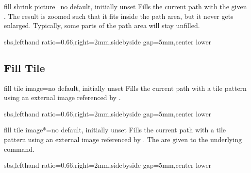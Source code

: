 \documentclass[a4paper,11pt]{article}
\begin{document}
\begin{myvoid}
\begin{docTikzKey}{fill shrink picture}{=}{no default, initially unset}
  Fills the current path with the given .
  The result is zoomed such that it fits inside the path area, but it never
  gets enlarged.
  Typically, some parts of the path area will stay unfilled.
\begin{dispExample*}{sbs,lefthand ratio=0.66,right=2mm,sidebyside gap=5mm,center lower}
\end{dispExample*}
\end{docTikzKey}


\clearpage
\subsection{Fill Tile}
\begin{docTikzKey}{fill tile image}{=}{no default, initially unset}
  Fills the current path with a tile pattern using an external image referenced by .
\begin{dispExample*}{sbs,lefthand ratio=0.66,right=2mm,sidebyside gap=5mm,center lower}
\end{dispExample*}
\end{docTikzKey}


\begin{docTikzKey}{fill tile image*}{=}{no default, initially unset}
  Fills the current path with a tile pattern using an external image referenced by .
  The  are given to the underlying  command.
\begin{dispExample*}{sbs,lefthand ratio=0.66,right=2mm,sidebyside gap=5mm,center lower}
\end{dispExample*}
\end{docTikzKey}


\end{myvoid}
\end{document}
